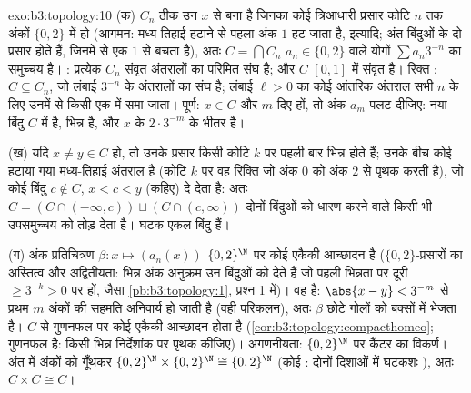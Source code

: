 \begin{solution}{exo:b3:topology:10}
(क) $C_n$ ठीक उन $x$ से बना है जिनका कोई त्रिआधारी प्रसार कोटि
$n$ तक अंकों $\{0, 2\}$ में हो (आगमन: मध्य तिहाई हटाने से पहला अंक
$1$ हट जाता है, इत्यादि; अंत-बिंदुओं के दो प्रसार होते हैं, जिनमें
से एक $1$ से बचता है), अतः $C = \bigcap C_n$ $a_n \in \{0,2\}$ वाले योगों $\sum a_n3^{-n}$ का समुच्चय
है। : प्रत्येक $C_n$ संवृत अंतरालों का परिमित संघ है; और $C$
$[0,1]$ में संवृत है। रिक्त : $C \subseteq C_n$, जो लंबाई $3^{-n}$ के अंतरालों
का संघ है; लंबाई $\ell > 0$ का कोई आंतरिक अंतराल सभी $n$ के लिए उनमें
से किसी एक में समा जाता। पूर्ण: $x \in C$ और $m$ दिए हों, तो अंक $a_m$
पलट दीजिए: नया बिंदु $C$ में है, भिन्न है, और $x$ के $2\cdot3^{-m}$ के
भीतर है।

(ख) यदि $x \neq y \in C$ हो, तो उनके प्रसार किसी कोटि $k$ पर पहली बार भिन्न
होते हैं; उनके बीच कोई हटाया गया मध्य-तिहाई अंतराल है (कोटि $k$
पर वह रिक्ति जो अंक $0$ को अंक $2$ से पृथक करती है), जो कोई
बिंदु $c \notin C$, $x < c < y$ (कहिए) दे देता है: अतः $C =
(C \cap (-\infty, c)) \sqcup (C \cap (c, \infty))$ दोनों बिंदुओं को
धारण करने वाले किसी भी उपसमुच्चय को तोड़ देता है। घटक एकल बिंदु हैं।

(ग) अंक प्रतिचित्रण $\beta\colon x \mapsto (a_n(x))$ $\{0,2\}^\N$ पर कोई एकैकी आच्छादन है
($\{0,2\}$-प्रसारों का अस्तित्व और अद्वितीयता: भिन्न अंक अनुक्रम उन
बिंदुओं को देते हैं जो पहली भिन्नता पर दूरी $\geq 3^{-k} > 0$ पर हों, जैसा
\cref{pb:b3:topology:1}, प्रश्न 1 में)। वह  है: $\abs{x - y} < 3^{-m}$ से प्रथम $m$ अंकों की
सहमति अनिवार्य हो जाती है (वही परिकलन), अतः $\beta$ छोटे गोलों को
 बक्सों में भेजता है।  $C$ से  गुणनफल पर कोई
 एकैकी आच्छादन  होता है (\cref{cor:b3:topology:compacthomeo}; गुणनफल  है:
किसी भिन्न निर्देशांक पर पृथक कीजिए)। अगणनीयता: $\{0,2\}^\N$ पर कैंटर का
विकर्ण। अंत में अंकों को गूँथकर $\{0,2\}^\N \times
\{0,2\}^\N \cong \{0,2\}^\N$ (कोई : दोनों दिशाओं
में घटकशः ), अतः $C
\times C \cong C$।
\end{solution}

